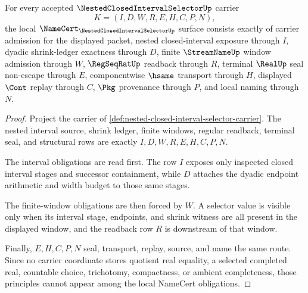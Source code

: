 \begin{theorem}
\label{thm:nested-closed-interval-selector-namecert-obligations}
For every accepted $\NestedClosedIntervalSelectorUp$ carrier
$$
K=(I,D,W,R,E,H,C,P,N),
$$
the local $\NameCert_{\NestedClosedIntervalSelectorUp}$ surface consists exactly of carrier admission for the displayed packet, nested closed-interval exposure through $I$, dyadic shrink-ledger exactness through $D$, finite $\StreamNameUp$ window admission through $W$, $\RegSeqRatUp$ readback through $R$, terminal $\RealUp$ seal non-escape through $E$, componentwise $\hsame$ transport through $H$, displayed $\Cont$ replay through $C$, $\Pkg$ provenance through $P$, and local naming through $N$.
\end{theorem}
\begin{proof}
Project the carrier of \autoref{def:nested-closed-interval-selector-carrier}. The nested interval source, shrink ledger, finite windows, regular readback, terminal seal, and structural rows are exactly $I,D,W,R,E,H,C,P,N$.

The interval obligations are read first. The row $I$ exposes only inspected closed interval stages and successor containment, while $D$ attaches the dyadic endpoint arithmetic and width budget to those same stages.

The finite-window obligations are then forced by $W$. A selector value is visible only when its interval stage, endpoints, and shrink witness are all present in the displayed window, and the readback row $R$ is downstream of that window.

Finally, $E,H,C,P,N$ seal, transport, replay, source, and name the same route. Since no carrier coordinate stores quotient real equality, a selected completed real, countable choice, trichotomy, compactness, or ambient completeness, those principles cannot appear among the local NameCert obligations.
\end{proof}

